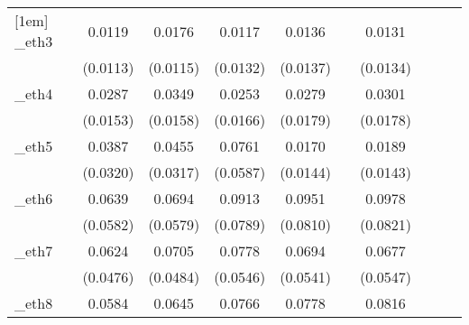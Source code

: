 \begin{table}[htbp]
\begin{tabular}{l*{9}{c}}
[1em]
\_eth3       &      0.0119         &      0.0176         &      0.0117         &      0.0136         &                     &      0.0131         &                     &                     &                     \\
            &    (0.0113)         &    (0.0115)         &    (0.0132)         &    (0.0137)         &                     &    (0.0134)         &                     &                     &                     \\
[1em]
\_eth4       &      0.0287\sym{*}  &      0.0349\sym{**} &      0.0253         &      0.0279         &                     &      0.0301\sym{*}  &                     &                     &                     \\
            &    (0.0153)         &    (0.0158)         &    (0.0166)         &    (0.0179)         &                     &    (0.0178)         &                     &                     &                     \\
[1em]
\_eth5       &      0.0387         &      0.0455         &      0.0761         &      0.0170         &                     &      0.0189         &                     &                     &                     \\
            &    (0.0320)         &    (0.0317)         &    (0.0587)         &    (0.0144)         &                     &    (0.0143)         &                     &                     &                     \\
[1em]
\_eth6       &      0.0639         &      0.0694         &      0.0913         &      0.0951         &                     &      0.0978         &                     &                     &                     \\
            &    (0.0582)         &    (0.0579)         &    (0.0789)         &    (0.0810)         &                     &    (0.0821)         &                     &                     &                     \\
[1em]
\_eth7       &      0.0624         &      0.0705         &      0.0778         &      0.0694         &                     &      0.0677         &                     &                     &                     \\
            &    (0.0476)         &    (0.0484)         &    (0.0546)         &    (0.0541)         &                     &    (0.0547)         &                     &                     &                     \\
[1em]
\_eth8       &      0.0584\sym{*}  &      0.0645\sym{*}  &      0.0766\sym{*}  &      0.0778         &                     &      0.0816\sym{*}  &                     &                     &                     \\

\end{tabular}
\end{table}
